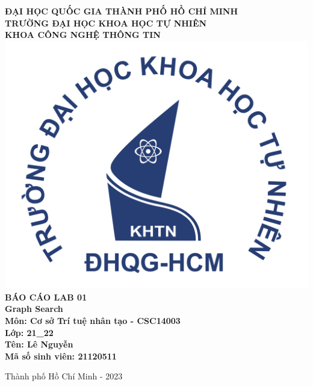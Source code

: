 \begin{titlepage}
    \begin{center}
    \textsc{\small \textbf{ĐẠI HỌC QUỐC GIA THÀNH PHỐ HỒ CHÍ MINH}}\\
    \textsc{\small \textbf{TRƯỜNG ĐẠI HỌC KHOA HỌC TỰ NHIÊN}}\\
    \textsc{\small \textbf{KHOA CÔNG NGHỆ THÔNG TIN}}\\[1.5cm]
    \includegraphics[width=.3\textwidth]{figure/logo.png}\\[2cm]
    
    {\fontsize{20}{20}\selectfont\bfseries BÁO CÁO LAB 01 \\[10pt]
    Graph Search}\\[2cm]%
    
    {\large \bfseries Môn: Cơ sở Trí tuệ nhân tạo - CSC14003 \\[10pt] Lớp: 21\_22}\\[2cm]
    
    {\bfseries Tên: Lê Nguyễn \\[10pt] Mã số sinh viên: 21120511}
    
    \vspace{5cm}
    
    Thành phố Hồ Chí Minh - 2023
    \end{center}
    
    \vfill
    \pagebreak
\end{titlepage}